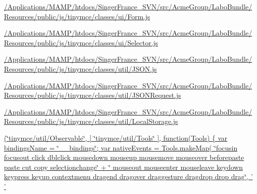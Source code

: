 \begin{DoxyCompactItemize}
\item 
\hyperlink{_2_applications_2_m_a_m_p_2htdocs_2_singer_france__s_v_n_2src_2_acme_group_2_labo_bundle_2_resoueef598a7a2300f492f416119b32dc1d4}{/\+Applications/\+M\+A\+M\+P/htdocs/\+Singer\+France\+\_\+\+S\+V\+N/src/\+Acme\+Group/\+Labo\+Bundle/\+Resources/public/js/tinymce/classes/ui/\+Form.\+js}
\item 
\hyperlink{_2_applications_2_m_a_m_p_2htdocs_2_singer_france__s_v_n_2src_2_acme_group_2_labo_bundle_2_resoua797fc1c93295ce755ea2b7334207fd0}{/\+Applications/\+M\+A\+M\+P/htdocs/\+Singer\+France\+\_\+\+S\+V\+N/src/\+Acme\+Group/\+Labo\+Bundle/\+Resources/public/js/tinymce/classes/ui/\+Selector.\+js}
\item 
\hyperlink{_2_applications_2_m_a_m_p_2htdocs_2_singer_france__s_v_n_2src_2_acme_group_2_labo_bundle_2_resou34d42116fbd953ae2d89e81721926182}{/\+Applications/\+M\+A\+M\+P/htdocs/\+Singer\+France\+\_\+\+S\+V\+N/src/\+Acme\+Group/\+Labo\+Bundle/\+Resources/public/js/tinymce/classes/util/\+J\+S\+O\+N.\+js}
\item 
\hyperlink{_2_applications_2_m_a_m_p_2htdocs_2_singer_france__s_v_n_2src_2_acme_group_2_labo_bundle_2_resouf74975d64a3b42f2f633fb8a55b3157f}{/\+Applications/\+M\+A\+M\+P/htdocs/\+Singer\+France\+\_\+\+S\+V\+N/src/\+Acme\+Group/\+Labo\+Bundle/\+Resources/public/js/tinymce/classes/util/\+J\+S\+O\+N\+Request.\+js}
\item 
\hyperlink{_2_applications_2_m_a_m_p_2htdocs_2_singer_france__s_v_n_2src_2_acme_group_2_labo_bundle_2_resoua394efecfcb23b12c7812fc97b92d157}{/\+Applications/\+M\+A\+M\+P/htdocs/\+Singer\+France\+\_\+\+S\+V\+N/src/\+Acme\+Group/\+Labo\+Bundle/\+Resources/public/js/tinymce/classes/util/\+Local\+Storage.\+js}
\item 
\hyperlink{_2_applications_2_m_a_m_p_2htdocs_2_singer_france__s_v_n_2src_2_acme_group_2_labo_bundle_2_resou822aa94bd61601fba17614467eaa4f14}{(\char`\"{}tinymce/util/\+Observable\char`\"{}, \mbox{[} \char`\"{}tinymce/util/\+Tools\char`\"{} \mbox{]}, function(\+Tools) \{ var bindings\+Name = \char`\"{}\+\_\+\+\_\+bindings\char`\"{}; var native\+Events = Tools.\+make\+Map(
		\char`\"{}focusin focusout click dblclick mousedown mouseup mousemove mouseover beforepaste paste cut copy selectionchange\char`\"{} +
		\char`\"{} mouseout mouseenter mouseleave keydown keypress keyup contextmenu dragend dragover draggesture dragdrop drop drag\char`\"{}, ' '
}
\end{DoxyCompactItemize}
